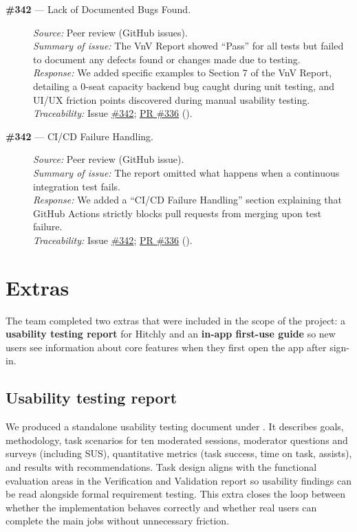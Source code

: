 \documentclass{article}
\begin{document}
\begin{description}
  \item[\textbf{\#342} --- Lack of Documented Bugs Found.]
  \textit{Source:} Peer review (GitHub issues). \\
  \textit{Summary of issue:} The VnV Report showed ``Pass'' for all tests but failed to document any defects found or changes made due to testing. \\
  \textit{Response:} We added specific examples to Section 7 of the VnV Report, detailing a 0-seat capacity backend bug caught during unit testing, and UI/UX friction points discovered during manual usability testing. \\
  \textit{Traceability:} Issue \href{https://github.com/hitchly/hitchly/issues/342}{\#342}; \href{https://github.com/hitchly/hitchly/pull/336}{PR \#336} ().

  \item[\textbf{\#342} --- CI/CD Failure Handling.]
  \textit{Source:} Peer review (GitHub issue). \\
  \textit{Summary of issue:} The report omitted what happens when a continuous integration test fails. \\
  \textit{Response:} We added a ``CI/CD Failure Handling'' section explaining that GitHub Actions strictly blocks pull requests from merging upon test failure. \\
  \textit{Traceability:} Issue \href{https://github.com/hitchly/hitchly/issues/342}{\#342}; \href{https://github.com/hitchly/hitchly/pull/336}{PR \#336} ().
\end{description}

\section{Extras}

The team completed two extras that were included in the scope of the project: a \textbf{usability testing report} for Hitchly and an \textbf{in-app first-use guide} so new users see information about core features when they first open the app after sign-in.

\subsection{Usability testing report}

We produced a standalone usability testing document under . It describes goals, methodology, task scenarios for ten moderated sessions, moderator questions and surveys (including SUS), quantitative metrics (task success, time on task, assists), and results with recommendations. Task design aligns with the functional evaluation areas in the Verification and Validation report so usability findings can be read alongside formal requirement testing. This extra closes the loop between whether the implementation behaves correctly and whether real users can complete the main jobs without unnecessary friction.
\end{document}
